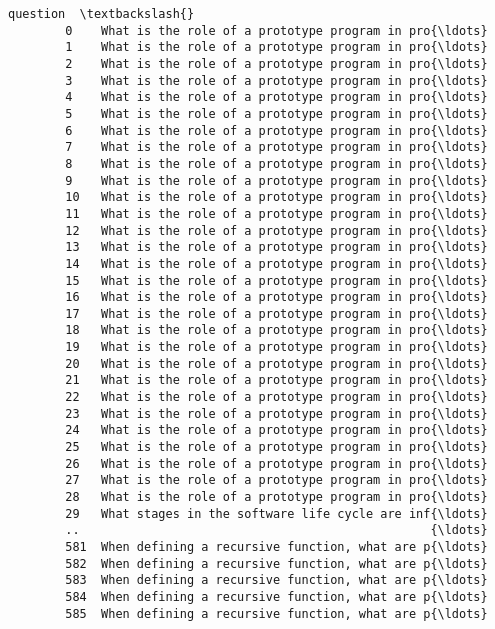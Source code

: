 \documentclass[11pt]{article}
\begin{document}
\begin{Verbatim}[commandchars=\\\{\}]
                                                      question  \textbackslash{}
        0    What is the role of a prototype program in pro{\ldots}   
        1    What is the role of a prototype program in pro{\ldots}   
        2    What is the role of a prototype program in pro{\ldots}   
        3    What is the role of a prototype program in pro{\ldots}   
        4    What is the role of a prototype program in pro{\ldots}   
        5    What is the role of a prototype program in pro{\ldots}   
        6    What is the role of a prototype program in pro{\ldots}   
        7    What is the role of a prototype program in pro{\ldots}   
        8    What is the role of a prototype program in pro{\ldots}   
        9    What is the role of a prototype program in pro{\ldots}   
        10   What is the role of a prototype program in pro{\ldots}   
        11   What is the role of a prototype program in pro{\ldots}   
        12   What is the role of a prototype program in pro{\ldots}   
        13   What is the role of a prototype program in pro{\ldots}   
        14   What is the role of a prototype program in pro{\ldots}   
        15   What is the role of a prototype program in pro{\ldots}   
        16   What is the role of a prototype program in pro{\ldots}   
        17   What is the role of a prototype program in pro{\ldots}   
        18   What is the role of a prototype program in pro{\ldots}   
        19   What is the role of a prototype program in pro{\ldots}   
        20   What is the role of a prototype program in pro{\ldots}   
        21   What is the role of a prototype program in pro{\ldots}   
        22   What is the role of a prototype program in pro{\ldots}   
        23   What is the role of a prototype program in pro{\ldots}   
        24   What is the role of a prototype program in pro{\ldots}   
        25   What is the role of a prototype program in pro{\ldots}   
        26   What is the role of a prototype program in pro{\ldots}   
        27   What is the role of a prototype program in pro{\ldots}   
        28   What is the role of a prototype program in pro{\ldots}   
        29   What stages in the software life cycle are inf{\ldots}   
        ..                                                 {\ldots}   
        581  When defining a recursive function, what are p{\ldots}   
        582  When defining a recursive function, what are p{\ldots}   
        583  When defining a recursive function, what are p{\ldots}   
        584  When defining a recursive function, what are p{\ldots}   
        585  When defining a recursive function, what are p{\ldots}   

\end{Verbatim}
\end{document}
